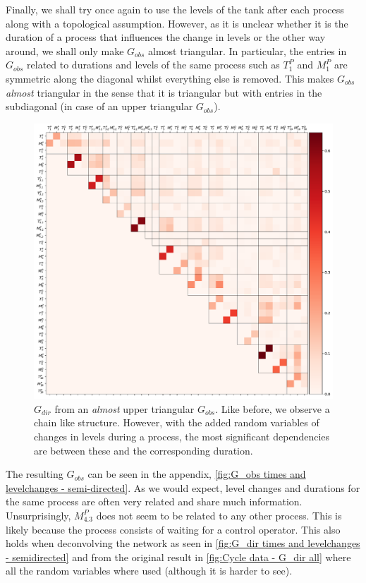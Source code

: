 \documentclass[../Thesis.tex]{subfiles}
\begin{document}
Finally, we shall try once again to use the levels of the tank after each process along with a topological assumption. However, as it is unclear whether it is the duration of a process that influences the change in levels or the other way around, we shall only make $G_{obs}$ almost triangular. In particular, the entries in $G_{obs}$ related to durations and levels of the same process such as $T^P_1$ and $M^P_1$ are symmetric along the diagonal whilst everything else is removed. This makes $G_{obs}$ \textit{almost} triangular in the sense that it is triangular but with entries in the subdiagonal (in case of an upper triangular $G_{obs}$).
\begin{figure}[ht]
    \centering
    \includegraphics[width = \linewidth]{figures/Cycle data/G_dir times and levelchanges - semi-directed.pdf}
    \caption{$G_{dir}$ from an \textit{almost} upper triangular $G_{obs}$. Like before, we observe a chain like structure. However, with the added random variables of changes in levels during a process, the most significant dependencies are between these and the corresponding duration.}
    \label{fig:G_dir times and levelchanges - semidirected}
\end{figure}
The resulting $G_{obs}$ can be seen in the appendix, \autoref{fig:G_obs times and levelchanges - semi-directed}. As we would expect, level changes and durations for the same process are often very related and share much information. Unsurprisingly, $M^P_{4.3}$ does not seem to be related to any other process. This is likely because the process consists of waiting for a control operator. This also holds when deconvolving the network as seen in \autoref{fig:G_dir times and levelchanges - semidirected} and from the original result in \autoref{fig:Cycle data - G_dir all} where all the random variables where used (although it is harder to see).
\end{document}
